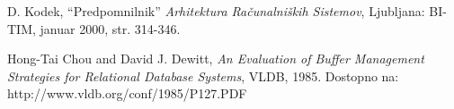 \documentclass[12pt,a4paper,openany]{book}
\begin{document}

\newpage

\label{stran_literatura}

\begin{thebibliography}{99}

 D. Kodek, ``Predpomnilnik'' 
\textit{Arhitektura Računalniških Sistemov}, Ljubljana: BI-TIM, januar 2000, str. 314-346.

 Hong-Tai Chou and David J. Dewitt, \textit{An Evaluation of Buffer Management Strategies for Relational Database Systems}, VLDB, 1985.
Dostopno na:\\
http://www.vldb.org/conf/1985/P127.PDF




\end{thebibliography}
\end{document}
